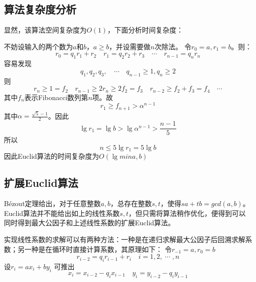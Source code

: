 \documentclass[11pt]{ctexart}
\begin{document}
\subsection{算法复杂度分析}
显然，该算法空间复杂度为$O(1)$，下面分析时间复杂度：

不妨设输入的两个数为$a$和$b$，$a\geqslant b$，并设需要做$n$次除法。
令$r_0 = a, r_1 = b$。则：
$$r_0 = q_1r_1 + r_2\quad r_1 = q_2r_2 + r_3 \quad \cdots \quad r_{n - 1} = q_nr_n $$
容易发现$$q_1, q_2, q_3,\quad \cdots \quad q_{n - 1} \geqslant 1, q_n \geqslant 2$$
则
$$r_n \geqslant 1 = f_2 \quad r_{n - 1} \geqslant 2r_n \geqslant 2f_2 = f_3 \quad r_{n-2} \geqslant f_2 + f_3 = f_4\quad \cdots$$
其中$f_n$表示Fibonacci数列第$n$项。故
$$r_1 \geqslant f_{n + 1} > \alpha^{n - 1}$$
其中$\alpha = \frac{\sqrt{5} - 1}{2}$。因此
$$\lg r_1 = \lg b > \lg \alpha^{n - 1} > \frac{n - 1}{5}$$
所以
$$n \leqslant 5\lg r_1 = 5\lg b$$
因此Euclid算法的时间复杂度为$O(\lg min{a, b})$

\subsection{扩展Euclid算法}
B\'ezout定理给出，对于任意整数$a, b$，总存在整数$s, t$，使得$sa + tb = gcd(a, b)$。Euclid算法并不能给出如上的线性系数$s, t$，但只需将算法稍作优化，便得到可以同时得到最大公因子和上述线性系数的扩展Euclid算法。

实现线性系数的求解可以有两种方法：一种是在递归求解最大公因子后回溯求解系数；另一种是在循环时直接计算系数，其原理如下：
令$r_{-1} = a, r_0 = b$
$$r_{i - 2} = q_i r_{i - 1} + r_i\quad i = 1, 2, \; \cdots \;,n$$
设$r_i = a x_i + b y_i$
可推出
$$x_i = x_{i - 2} - q_i x_{i - 1} \quad y_i = y_{i - 2} - q_i y_{i - 1}$$
\end{document}
